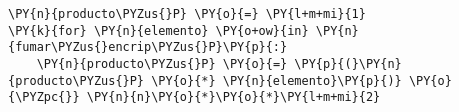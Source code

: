 
\begin{Verbatim}[commandchars=\\\{\}]
\PY{n}{producto\PYZus{}P} \PY{o}{=} \PY{l+m+mi}{1}
\PY{k}{for} \PY{n}{elemento} \PY{o+ow}{in} \PY{n}{fumar\PYZus{}encrip\PYZus{}P}\PY{p}{:}
    \PY{n}{producto\PYZus{}P} \PY{o}{=} \PY{p}{(}\PY{n}{producto\PYZus{}P} \PY{o}{*} \PY{n}{elemento}\PY{p}{)} \PY{o}{\PYZpc{}} \PY{n}{n}\PY{o}{*}\PY{o}{*}\PY{l+m+mi}{2}
\end{Verbatim}